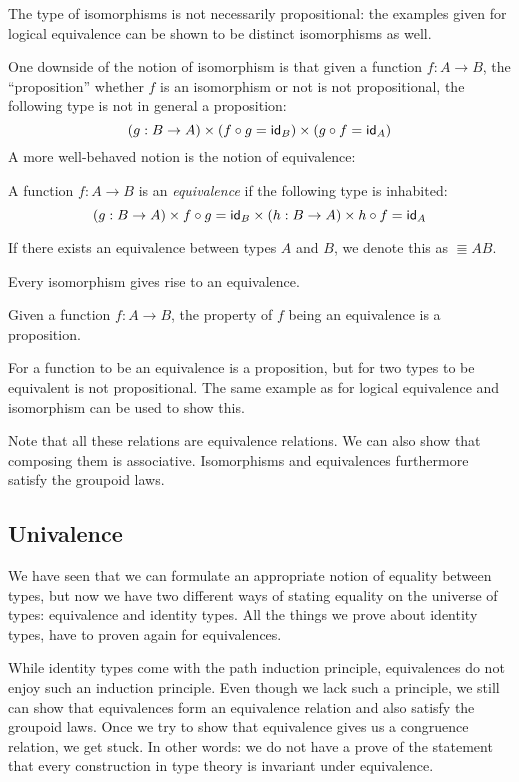 The type of isomorphisms is not necessarily propositional: the
examples given for logical equivalence can be shown to be distinct
isomorphisms as well.

One downside of the notion of isomorphism is that given a function
$f : A \to B$, the ``proposition'' whether $f$ is an isomorphism or
not is not propositional, \ie the following type is not in general a
proposition:
$$
(g : B \to A) \times (f \circ g = \id_B) \times (g \circ f = \id_A)
$$
A more well-behaved notion is the notion of equivalence:
\begin{definition}[Equivalence]
  A function $f : A \to B$ is an \emph{equivalence} if the following
  type is inhabited:
  $$
  (g : B \to A) \times f \circ g = \id_B \times (h : B \to A) \times h \circ f = \id_A
  $$
  
  If there exists an equivalence between types $A$ and $B$, we denote
  this as $\Equiv{A}{B}$.
\end{definition}

\begin{proposition}
  Every isomorphism gives rise to an equivalence.
\end{proposition}

\begin{proposition}
  Given a function $f : A \to B$, the property of $f$ being an
  equivalence is a proposition.
\end{proposition}

For a function to be an equivalence is a proposition, but for two
types to be equivalent is not propositional. The same example as for
logical equivalence and isomorphism can be used to show this.

Note that all these relations are equivalence relations. We can also
show that composing them is associative. Isomorphisms and
equivalences furthermore satisfy the groupoid laws.

\subsection{Univalence}

We have seen that we can formulate an appropriate notion of equality
between types, but now we have two different ways of stating equality
on the universe of types: equivalence and identity types. All the
things we prove about identity types, have to proven again for
equivalences. 

While identity types come with the path induction principle,
equivalences do not enjoy such an induction principle. Even though we
lack such a principle, we still can show that equivalences form an
equivalence relation and also satisfy the groupoid laws. Once we try
to show that equivalence gives us a congruence relation, we get
stuck. In other words: we do not have a prove of the statement that
every construction in type theory is invariant under equivalence.

